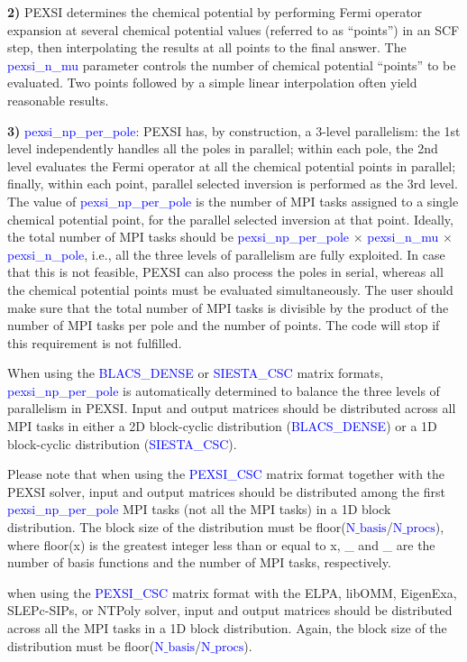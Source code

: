 \documentclass{report}
\newcommand{\tcb}[1]{\textcolor{blue}{#1}}
\begin{document}
\textbf{2)} PEXSI determines the chemical potential by performing Fermi operator expansion at several chemical potential values (referred to as ``points'') in an SCF step, then interpolating the results at all points to the final answer. The \tcb{pexsi\_n\_mu} parameter controls the number of chemical potential ``points'' to be evaluated. Two points followed by a simple linear interpolation often yield reasonable results.

\textbf{3)} \tcb{pexsi\_np\_per\_pole}: PEXSI has, by construction, a 3-level parallelism: the 1st level independently handles all the poles in parallel; within each pole, the 2nd level evaluates the Fermi operator at all the chemical potential points in parallel; finally, within each point, parallel selected inversion is performed as the 3rd level. The value of \tcb{pexsi\_np\_per\_pole} is the number of MPI tasks assigned to a single chemical potential point, for the parallel selected inversion at that point. Ideally, the total number of MPI tasks should be \tcb{pexsi\_np\_per\_pole} $\times$ \tcb{pexsi\_n\_mu} $\times$ \tcb{pexsi\_n\_pole}, i.e., all the three levels of parallelism are fully exploited. In case that this is not feasible, PEXSI can also process the poles in serial, whereas all the chemical potential points must be evaluated simultaneously. The user should make sure that the total number of MPI tasks is divisible by the product of the number of MPI tasks per pole and the number of points. The code will stop if this requirement is not fulfilled.

When using the \tcb{BLACS\_DENSE} or \tcb{SIESTA\_CSC} matrix formats, \tcb{pexsi\_np\_per\_pole} is automatically determined to balance the three levels of parallelism in PEXSI. Input and output matrices should be distributed across all MPI tasks in either a 2D block-cyclic distribution (\tcb{BLACS\_DENSE}) or a 1D block-cyclic distribution (\tcb{SIESTA\_CSC}).

Please note that when using the \tcb{PEXSI\_CSC} matrix format together with the PEXSI solver, input and output matrices should be distributed among the first \tcb{pexsi\_np\_per\_pole} MPI tasks (not all the MPI tasks) in a 1D block distribution. The block size of the distribution must be floor(\tcb{$\text{N}\_\text{basis}$}/\tcb{$\text{N}\_\text{procs}$}), where floor(x) is the greatest integer less than or equal to x, \tcb{\_} and \tcb{\_} are the number of basis functions and the number of MPI tasks, respectively.

when using the \tcb{PEXSI\_CSC} matrix format with the ELPA, libOMM, EigenExa, SLEPc-SIPs, or NTPoly solver, input and output matrices should be distributed across all the MPI tasks in a 1D block distribution. Again, the block size of the distribution must be floor(\tcb{$\text{N}\_\text{basis}$}/\tcb{$\text{N}\_\text{procs}$}).
\end{document}
